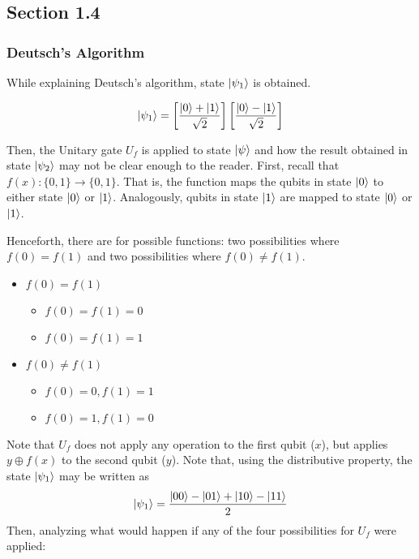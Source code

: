 \subsection{Section 1.4}
\subsubsection{Deutsch's Algorithm}

While explaining Deutsch's algorithm, state \( \ket{\psi_1} \) is obtained.

\[
\ket{\psi_1} = \left[ \frac{\ket{0} + \ket{1}}{\sqrt{2}} \right]
    \left[ \frac{\ket{0} - \ket{1}}{\sqrt{2}} \right]
\]

Then, the Unitary gate \(U_f\) is applied to state \(\ket{\psi}\) and how the result obtained in state \(\ket{\psi_2}\) may not be clear enough to the reader. First, recall that \(f(x) : \{0, 1\} \to \{0, 1\}\). That is, the function maps the qubits in state \(\ket{0}\) to either state \(\ket{0}\) or \(\ket{1}\). Analogously, qubits in state \(\ket{1}\) are mapped to state \(\ket{0}\) or \(\ket{1}\).

Henceforth, there are for possible functions: two possibilities where \(f(0) = f(1)\) and two possibilities where \(f(0) \neq f(1)\).

\begin{itemize}
    \item \(f(0) = f(1)\)
    \begin{itemize}
        \item \(f(0) = f(1) = 0\)
        \item \(f(0) = f(1) = 1\)
    \end{itemize}
    
    \item \(f(0) \neq f(1)\)
    \begin{itemize}
        \item \(f(0) = 0, f(1) = 1\)
        \item \(f(0) = 1, f(1) = 0\)
    \end{itemize}
\end{itemize}

Note that \(U_f\) does not apply any operation to the first qubit (\(x\)), but applies \(y \oplus f(x)\) to the second qubit (\(y\)). Note that, using the distributive property, the state \(\ket{\psi_1}\) may be written as
\[\ket{\psi_1} = \frac{\ket{00} - \ket{01} + \ket{10} - \ket{11}}{2}\]
Then, analyzing what would happen if any of the four possibilities for \(U_f\) were applied:

